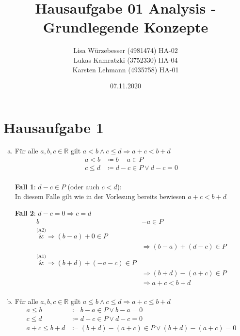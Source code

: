 \documentclass{article}
\author{Lisa Würzebesser (4981474) HA-02 \\ Lukas Kamratzki (3752330) HA-04 \\ Karsten Lehmann (4935758) HA-01}
\date{07.11.2020}
\title{Hausaufgabe 01 Analysis - Grundlegende Konzepte}
\begin{document}
\maketitle
\newpage

\section*{Hausaufgabe 1}

\begin{enumerate}[a)]
\item Für alle $a, b, c \in \mathbb{R}$ gilt $a < b \land c \leq d \Rightarrow a + c < b + d$
  \begin{align*}
    a < b &\coloneqq b - a \in P \\
    c \leq d &\coloneqq d - c \in P \lor d - c = 0 \\
  \end{align*} 
  \begin{minipage}[t]{.45\textwidth}
    \textbf{Fall 1}: $d - c \in P$ (oder auch $c < d$): \\
    
    In diesem Falle gilt wie in der Vorlesung bereits bewiesen
    $a + c < b + d$
  \end{minipage}
  \hfill
  \vrule
  \hfill
  \begin{minipage}[t]{.45\textwidth}
    \textbf{Fall 2}: $d - c = 0 \Rightarrow c = d$
    \begin{align*}
      b &- a \in P \\
      \overset{\text{(A2)}}&{\Rightarrow} (b - a) + 0 \in P \\
      &\Rightarrow (b - a) + (d - c) \in P \\
      \overset{\text{(A1)}}&{\Rightarrow} (b + d) + (-a -c) \in P\\
      &\Rightarrow (b + d) - (a + c) \in P \\
      &\Rightarrow a + c < b + d \\
    \end{align*}
  \end{minipage}

\item Für alle $a, b, c \in \mathbb{R}$ gilt $a \leq b \land c \leq d \Rightarrow a + c \leq b + d$
  \begin{align*}
    a \leq b &\coloneqq b - a \in P \lor b - a = 0 \\
    c \leq d &\coloneqq d - c \in P \lor d - c = 0 \\
    a + c \leq b + d &\coloneqq (b + d) - (a + c) \in P \lor (b + d) - (a + c) = 0 \\ 
  \end{align*}
  

\end{enumerate}
\end{document}

